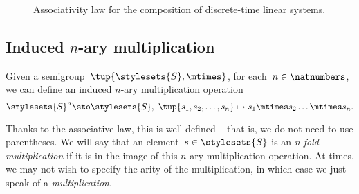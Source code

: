\begin{figure}[tbh]
	\centering
	\prflinepadbefore=5pt
	\prflinepadafter=5pt
	{
	}
	\caption{Associativity law for the composition of discrete-time linear systems. }
	\label{fig:ass_dyn_syst}
\end{figure}

\subsection{Induced $n$-ary multiplication}
Given a semigroup~$\tup{\stylesets{S}, \mtimes}$, for each~$n \in \natnumbers$, we can define an induced $n$-ary multiplication operation
\begin{equation*}
	\stylesets{S}^n \sto \stylesets{S}, \ \tup{s_1, s_2, \dots, s_n} \mapsto s_1 \mtimes s_2 \dots \mtimes s_n.
\end{equation*}


Thanks to the associative law, this is well-defined -- that is, we do not need to use parentheses.
We will say that an element~$s \in \stylesets{S}$ is an \emph{n-fold multiplication} if it is in the image of this $n$-ary multiplication operation.
At times, we may not wish to specify the arity of the multiplication, in which case we just speak of a \emph{multiplication}.

\showslides{
	\begin{forslides}
		\begin{equation}
			\label{eq:sg-mora}
			\mora
		\end{equation}
		\begin{equation}
			\label{eq:sg-morb}
			\morb
		\end{equation}
		\begin{equation}
			\label{eq:sg-morab}
			\mora\then\morb
		\end{equation}
	\end{forslides}
}
